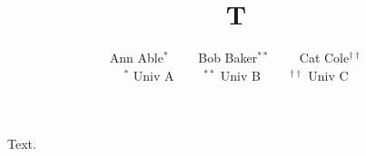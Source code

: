 \documentclass{article}
\title{T}
\author{Ann Able$^{*}$ \ \ \ \ Bob Baker$^{**}$ \ \ \ \ Cat Cole$^{\dagger\dagger}$ \\ $^{*}$ Univ A \ \ \ \ $^{**}$ Univ B \ \ \ \ $^{\dagger\dagger}$ Univ C}
\begin{document}
\maketitle
Text.
\end{document}
